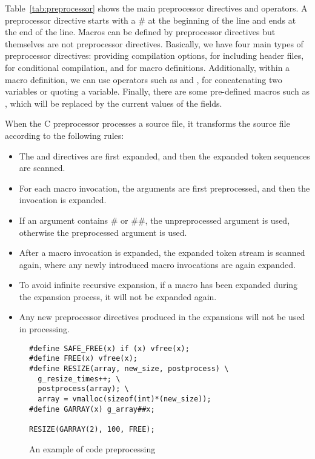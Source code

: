 Table~\ref{tab:preprocessor} shows the main preprocessor directives
and operators. A preprocessor directive starts with a \# at the
beginning of the line and ends at the end of the line. Macros can be
defined by preprocessor directives but themselves are not preprocessor directives.
Basically, we have four main types of preprocessor directives:
 providing compilation options,  for including header files,  for
conditional compilation, and  for macro definitions. Additionally, within
a macro definition, we can use operators such as \code{\#\#} and \code{\#}, for
concatenating two variables or quoting a variable. Finally, there are
some pre-defined macros such as , which will be replaced by
the current values of the fields. 

When the C preprocessor processes a source file, it transforms the source file according to the following rules:
\begin{itemize}
\item The  and  directives are
  first expanded, and then the expanded token sequences are scanned.
\item For each macro invocation, the arguments are first preprocessed, and then
  the invocation is expanded.
\item If an argument contains \# or \#\#, the unpreprocessed argument is
  used, otherwise the preprocessed argument is used.
\item After a macro invocation is expanded, the expanded token
  stream is scanned again, where any newly introduced macro
  invocations are again expanded.
\item To avoid infinite recursive expansion, if a macro has been
  expanded during the expansion process, it will not be expanded
  again.
\item Any new preprocessor directives produced in the expansions will
  not be used in processing. 
\end{itemize}


\begin{figure}[ht]
  \centering
\begin{lstlisting}
#define SAFE_FREE(x) if (x) vfree(x);
#define FREE(x) vfree(x);
#define RESIZE(array, new_size, postprocess) \
  g_resize_times++; \
  postprocess(array); \
  array = vmalloc(sizeof(int)*(new_size));
#define GARRAY(x) g_array##x;

RESIZE(GARRAY(2), 100, FREE);
\end{lstlisting}
  \caption{An example of code preprocessing\label{fig:example} }
\end{figure}

